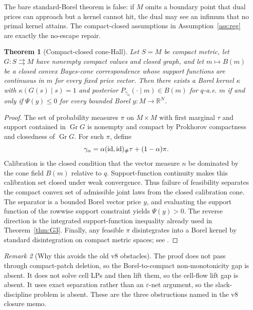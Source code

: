 \documentclass[11pt]{article}
\newtheorem{theorem}{Theorem}
\theoremstyle{definition}
\theoremstyle{remark}
\newtheorem{remark}[theorem]{Remark}
\newcommand{\R}{\mathbb{R}}
\newcommand{\eps}{\varepsilon}
\begin{document}
The bare standard-Borel theorem is false: if $M$ omits a boundary point that dual prices can approach but a kernel cannot hit, the dual may see an infimum that no primal kernel attains. The compact-closed assumptions in Assumption~\ref{ass:reg} are exactly the no-escape repair.

\begin{theorem}[Compact-closed cone-Hall]\label{thm:G2c}
Let $S=M$ be compact metric, let $G:S\rightrightarrows M$ have nonempty compact values and closed graph, and let $m\mapsto B(m)$ be a closed convex Bayes-cone correspondence whose support functions are continuous in $m$ for every fixed price vector. Then there exists a Borel kernel $\kappa$ with $\kappa(G(s)\mid s)=1$ and posterior $P_{\gamma_\alpha}(\cdot\mid m)\in B(m)$ for $q$-a.e. $m$ if and only if $\Psi(y)\le0$ for every bounded Borel $y:M\to\R^N$.
\end{theorem}

\begin{proof}
The set of probability measures $\pi$ on $M\times M$ with first marginal $\tau$ and support contained in $\operatorname{Gr}G$ is nonempty and compact by Prokhorov compactness and closedness of $\operatorname{Gr}G$. For such $\pi$, define
\[
  \gamma_\alpha=\alpha({\rm id},{\rm id})_\#\tau+(1-\alpha)\pi.
\]
Calibration is the closed condition that the vector measure $n$ be dominated by the cone field $B(m)$ relative to $q$. Support-function continuity makes this calibration set closed under weak convergence. Thus failure of feasibility separates the compact convex set of admissible joint laws from the closed calibration cone. The separator is a bounded Borel vector price $y$, and evaluating the support function of the rowwise support constraint yields $\Psi(y)>0$. The reverse direction is the integrated support-function inequality already used in Theorem~\ref{thm:G3}. Finally, any feasible $\pi$ disintegrates into a Borel kernel by standard disintegration on compact metric spaces; see \cite{Kallenberg1997}.
\end{proof}

\begin{remark}[Why this avoids the old v8 obstacles]
The proof does not pass through compact-patch deletion, so the Borel-to-compact non-monotonicity gap is absent. It does not solve cell LPs and then lift them, so the cell-flow lift gap is absent. It uses exact separation rather than an $\eps$-net argument, so the slack-discipline problem is absent. These are the three obstructions named in the v8 closure memo.
\end{remark}
\end{document}
